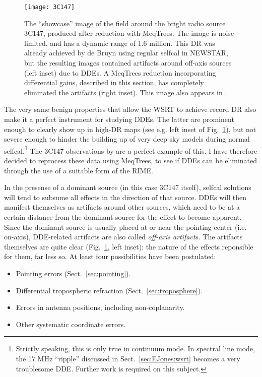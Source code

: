 \documentclass[]{aa}
\begin{document}
\begin{figure}
\sidecaption
\centering
\texttt{[image: 3C147]}
\caption{\label{fig:3C147}The ``showcase'' image of the field around the bright radio source 3C147, produced after reduction with MeqTrees. The image is noise-limited, and has a dynamic range of 1.6 million. This DR was already achieved by de Bruyn using regular selfcal in NEWSTAR, but the resulting images contained artifacts around off-axis sources (left inset) due to DDEs. A MeqTrees reduction incorporating differential gains, described in this section, has completely eliminated the artifacts (right inset). This image also appears in \citet{meqtrees}.}
\end{figure}


The very same benign properties that allow the WSRT to achieve record DR also make it a perfect instrument for studying DDEs. The latter are prominent enough to clearly show up in high-DR maps (see e.g. left inset of Fig.~\ref{fig:3C147}), but not severe enough to hinder the building up of very deep sky models during normal selfcal.\footnote{Strictly speaking, this is only true in continuum mode. In spectral line mode, the 17 MHz ``ripple'' discussed in Sect.~\ref{sec:EJones:wsrt} becomes a very troublesome DDE. Further work is required on this subject.} The 3C147 observations by \citet{deBruyn:3C147} are a perfect example of this. I have therefore decided to reprocess these data using MeqTrees, to see if DDEs can be eliminated through the use of a suitable form of the RIME.

In the presense of a dominant source (in this case 3C147 itself), selfcal solutions will tend to subsume all effects in the direction of that source. DDEs will then manifest themselves as artifacts around other sources, which need to be at a certain distance from the dominant source for the effect to become apparent. Since the dominant source is usually placed at or near the pointing center (i.e. on-axis), DDE-related artifacts are also called {\em off-axis artifacts.} The artifacts themselves are quite clear (Fig.~\ref{fig:3C147}, left inset): the nature of the effects reponsible for them, far less so. At least four possibilities have been postulated:

\begin{itemize}
\item Pointing errors (Sect.~\ref{sec:pointing}).
\item Differential tropospheric refraction (Sect.~\ref{sec:troposphere}).
\item Errors in antenna positions, including non-coplanarity.
\item Other systematic coordinate errors.
\end{itemize}
\end{document}
